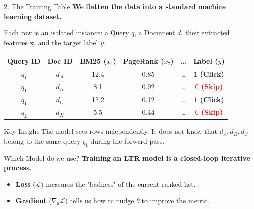 \documentclass[aspectratio=169]{beamer}
\newif\ifanimated
\newcommand{\cpause}{\ifanimated\pause\fi}
\begin{document}
\begin{frame}[shrink=5]{2. The Training Table}
\textbf{We flatten the data into a standard machine learning dataset.}

\vspace{0.8em}
Each row is an isolated instance: a Query $q$, a Document $d$, their extracted features $\mathbf{x}$, and the target label $y$.

\vspace{1em}
\begin{center}
\small
\begin{tabular}{cc | ccc | c}
\toprule
\textbf{Query ID} & \textbf{Doc ID} & \textbf{BM25 ($x_1$)} & \textbf{PageRank ($x_2$)} & \dots & \textbf{Label ($y$)} \\
\midrule
$q_1$ & $d_A$ & 12.4 & 0.85 & \dots & \textcolor{green!70!black}{\textbf{1 (Click)}} \\
$q_1$ & $d_B$ & 8.1 & 0.92 & \dots & \textcolor{red}{\textbf{0 (Skip)}} \\
$q_1$ & $d_C$ & 15.2 & 0.12 & \dots & \textcolor{green!70!black}{\textbf{1 (Click)}} \\
\midrule
$q_2$ & $d_X$ & 5.5 & 0.44 & \dots & \textcolor{red}{\textbf{0 (Skip)}} \\
\bottomrule
\end{tabular}
\end{center}
\cpause
\vspace{0.5em}
\begin{exampleblock}{Key Insight}
The model sees rows independently. It does not know that $d_A, d_B, d_C$ belong to the same query $q_1$ during the forward pass.
\end{exampleblock}
\end{frame}


\begin{frame}{Which Model do we use?}
\textbf{Training an LTR model is a closed-loop iterative process.}

\vspace{0.8em}
\begin{center}
\resizebox{0.9\textwidth}{!}{

}
\end{center}

\vspace{0.8em}
\begin{itemize}
    \item \textbf{Loss} ($\mathcal{L}$) measures the "badness" of the current ranked list.
    \item \textbf{Gradient} ($\nabla_\theta \mathcal{L}$) tells us how to nudge $\theta$ to improve the metric.
\end{itemize}
\end{frame}
\end{document}
